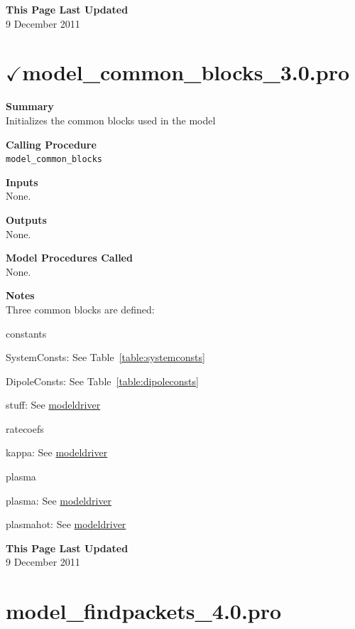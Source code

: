 \documentclass[11pt]{article}
\newcommand\descrip[1]{\textsf{\textbf{\large{#1}}}\\}
\begin{document}
\descrip{This Page Last Updated}
9 December 2011

\clearpage

\section{$\checkmark$model\_common\_blocks\_3.0.pro} \label{sec:model_common_blocks}

\descrip{Summary}
Initializes the common blocks used in the model

\descrip{Calling Procedure}
\verb+model_common_blocks+

\descrip{Inputs}
None.

\descrip{Outputs}
None.

\descrip{Model Procedures Called}
None.

\descrip{Notes}
Three common blocks are defined:

\begin{compactenum} \vspace{-12pt}
\item constants
  \begin{compactitem} 
  \item SystemConsts: See Table~\ref{table:systemconsts}
  \item DipoleConsts: See Table~\ref{table:dipoleconsts}
  \item stuff: See \hyperref[sec:modeldriver]{modeldriver}
  \end{compactitem}
\item ratecoefs
  \begin{compactitem} 
  \item kappa: See \hyperref[sec:modeldriver]{modeldriver} 
  \end{compactitem}
\item plasma
  \begin{compactitem} 
  \item plasma: See \hyperref[sec:modeldriver]{modeldriver}  
  \item plasmahot: See \hyperref[sec:modeldriver]{modeldriver}  
  \end{compactitem}
\end{compactenum}

\descrip{This Page Last Updated}
9 December 2011

\clearpage

\section{model\_findpackets\_4.0.pro} \label{sec:model_findpackets}
\end{document}
